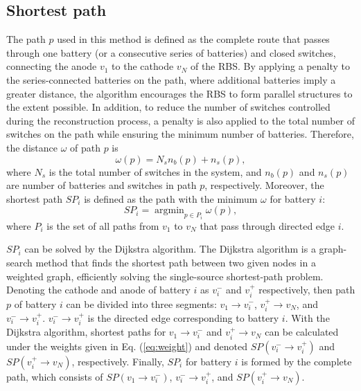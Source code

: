 \documentclass{article}
\begin{document}
\subsection{Shortest path}

The path $p$ used in this method is defined as the complete route that passes through one battery (or a consecutive series of batteries) and closed switches, connecting the anode $v_1$ to the cathode $v_N$ of the RBS.
By applying a penalty to the series-connected batteries on the path, where additional batteries imply a greater distance, the algorithm encourages the RBS to form parallel structures to the extent possible.
In addition, to reduce the number of switches controlled during the reconstruction process, a penalty is also applied to the total number of switches on the path while ensuring the minimum number of batteries.
Therefore, the distance $\omega$ of path $p$ is  
\begin{equation}\label{eq:weight}
    \omega(p) = N_s  n_b (p) + n_s (p),
\end{equation}
where $N_s$ is the total number of switches in the system, 
and $n_b(p)$ and $n_s(p)$ are number of batteries and switches in path $p$, respectively. 
Moreover, the shortest path $SP_i$ is defined as the path with the minimum $\omega$ for battery $i$:
\begin{equation}\label{eq:def_sp}
    SP_i = \mathop{\arg\min}_{p \in P_i} \omega(p),
\end{equation}
where $P_i$ is the set of all paths from $v_1$ to $v_N$ that pass through directed edge $i$.


$SP_i$ can be solved by the Dijkstra algorithm.
The Dijkstra algorithm is a graph-search method that finds the shortest path between two given nodes in a weighted graph, efficiently solving the single-source shortest-path problem.
Denoting the cathode and anode of battery $i$ as $v_i^-$ and $v_i^+$ respectively, then path $p$ of battery $i$  can be divided into three segments: $v_1 \rightarrow v_i^-$, $v_i^+ \rightarrow v_N$, and $v_i^- \rightarrow v_i^+$. $v_i^- \rightarrow v_i^+$ is the directed edge corresponding to battery $i$. 
With the Dijkstra algorithm, shortest paths for $v_1 \rightarrow v_i^-$ and $v_i^+ \rightarrow v_N$ can be calculated under the weights given in Eq. (\ref{eq:weight}) and denoted $SP(v_i^- \rightarrow v_i^+)$ and $SP(v_i^+ \rightarrow v_N)$, respectively.
Finally, $SP_i$ for battery $i$ is formed by the complete path, which consists of $SP(v_1 \rightarrow v_i^-)$, $v_i^- \rightarrow v_i^+$, and $SP(v_i^+ \rightarrow v_N)$.
\end{document}

